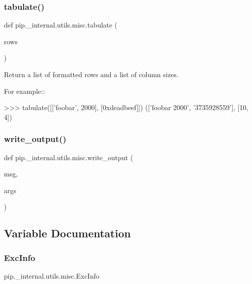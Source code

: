 \subsubsection{\texorpdfstring{tabulate()}{tabulate()}}
{\footnotesize\ttfamily def pip.\+\_\+internal.\+utils.\+misc.\+tabulate (\begin{DoxyParamCaption}\item[{}]{rows }\end{DoxyParamCaption})}

\begin{DoxyVerb}Return a list of formatted rows and a list of column sizes.

For example::

>>> tabulate([['foobar', 2000], [0xdeadbeef]])
(['foobar     2000', '3735928559'], [10, 4])
\end{DoxyVerb}
 \mbox{\label{namespacepip_1_1__internal_1_1utils_1_1misc_a475141640159b93c2d70b68f5435f3a4}} 
\subsubsection{\texorpdfstring{write\+\_\+output()}{write\_output()}}
{\footnotesize\ttfamily def pip.\+\_\+internal.\+utils.\+misc.\+write\+\_\+output (\begin{DoxyParamCaption}\item[{}]{msg,  }\item[{}]{args }\end{DoxyParamCaption})}



\subsection{Variable Documentation}
\mbox{\label{namespacepip_1_1__internal_1_1utils_1_1misc_a5283942e61824eb907951057408d1c15}} 
\subsubsection{\texorpdfstring{Exc\+Info}{ExcInfo}}
{\footnotesize\ttfamily pip.\+\_\+internal.\+utils.\+misc.\+Exc\+Info}

